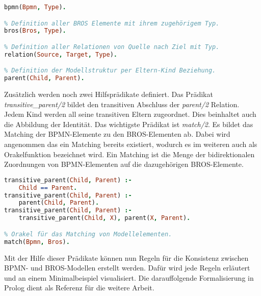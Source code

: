 \begin{lstlisting}[language=Prolog, caption=Definitionen der Faktenbasis, label=lst:definition_facts]
% Definition aller BPMN Elemente mit ihrem zugehörigem Typ.
bpmn(Bpmn, Type).

% Definition aller BROS Elemente mit ihrem zugehörigem Typ.
bros(Bros, Type).

% Definition aller Relationen von Quelle nach Ziel mit Typ.
relation(Source, Target, Type).

% Definition der Modellstruktur per Eltern-Kind Beziehung.
parent(Child, Parent).
\end{lstlisting}

Zusätzlich werden noch zwei Hilfsprädikate definiert.
Das Prädikat \emph{transitive\_parent/2} bildet den transitiven Abschluss der \emph{parent/2} Relation.
Jedem Kind werden all seine transitiven Eltern zugeordnet.
Dies beinhaltet auch die Abbildung der Identität.
Das wichtigste Prädikat ist \emph{match/2}.
Es bildet das Matching der BPMN-Elemente zu den BROS-Elementen ab.
Dabei wird angenommen das ein Matching bereits existiert, wodurch es im weiteren auch als Orakelfunktion bezeichnet wird.
Ein Matching ist die Menge der bidirektionalen Zuordnungen von BPMN-Elementen auf die dazugehörigen BROS-Elemente. 

\begin{lstlisting}[language=Prolog, caption=Definitionen der weiterführenden Regeln, label=lst:definition_predicats]
% Transitiver Abschluss der Modellstruktur.
transitive_parent(Child, Parent) :- 
    Child == Parent.
transitive_parent(Child, Parent) :- 
    parent(Child, Parent).
transitive_parent(Child, Parent) :- 
    transitive_parent(Child, X), parent(X, Parent).

% Orakel für das Matching von Modellelementen.
match(Bpmn, Bros).
\end{lstlisting}

Mit der Hilfe dieser Prädikate können nun Regeln für die Konsistenz zwischen BPMN- und BROS-Modellen erstellt werden.
Dafür wird jede Regeln erläutert und an einem Minimalbeispiel visualisiert.
Die darauffolgende Formalisierung in Prolog dient als Referenz für die weitere Arbeit.

